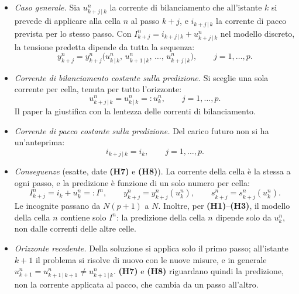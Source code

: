 \documentclass[11pt,a4paper]{article}
\newcommand{\ip}[1]{\textbf{(H#1)}}         %
\begin{document}
\begin{itemize}
  \item \emph{Caso generale.} Sia $u^n_{k+j\,|\,k}$ la corrente di
        bilanciamento che all'istante $k$ si prevede di applicare alla cella
        $n$ al passo $k+j$, e $i_{k+j\,|\,k}$ la corrente di pacco prevista
        per lo stesso passo. Con $I^n_{k+j} = i_{k+j\,|\,k} + u^n_{k+j\,|\,k}$
        nel modello discreto, la tensione predetta dipende da tutta la
        sequenza:
        \[
          y^n_{k+j} = y^n_{k+j}\bigl(u^n_{k\,|\,k},\, u^n_{k+1\,|\,k},\, \dots,\,
                      u^n_{k+j\,|\,k}\bigr) , \qquad j = 1, \dots, p .
          \tag*{[L,~(U1)]}
        \]
  \item[\ip{7}] \emph{Corrente di bilanciamento costante sulla predizione.} Si
        sceglie una sola corrente per cella, tenuta per tutto l'orizzonte:
        \[
          u^n_{k+j\,|\,k} = u^n_{k\,|\,k} =: u^n_k , \qquad j = 1, \dots, p .
          \tag*{[L,~(U2)]; eq.~6b}
        \]
        Il paper la giustifica con la lentezza delle correnti di
        bilanciamento.
  \item[\ip{8}] \emph{Corrente di pacco costante sulla predizione.} Del carico
        futuro non si ha un'anteprima:
        \[
          i_{k+j\,|\,k} = i_k , \qquad j = 1, \dots, p .
          \tag*{[L,~(U2)]}
        \]
  \item \emph{Conseguenze} (esatte, date \ip{7} e \ip{8}). La corrente della
        cella è la stessa a ogni passo, e la predizione è funzione di un solo
        numero per cella:
        \[
          I^n_{k+j} = i_k + u^n_k =: I^n , \qquad
          y^n_{k+j} = y^n_{k+j}(u^n_k) , \qquad
          s^n_{k+j} = s^n_{k+j}(u^n_k) .
          \tag*{[L,~(1), (U3)]}
        \]
        Le incognite passano da $N(p+1)$ a $N$. Inoltre, per \ip{1}--\ip{3},
        il modello della cella $n$ contiene solo $I^n$: la predizione della
        cella $n$ dipende solo da $u^n_k$, non dalle correnti delle altre
        celle.
  \item \emph{Orizzonte recedente.} Della soluzione si applica solo il primo
        passo; all'istante $k+1$ il problema si risolve di nuovo con le nuove
        misure, e in generale
        $u^n_{k+1} = u^n_{k+1\,|\,k+1} \ne u^n_{k+1\,|\,k}$. \ip{7} e \ip{8}
        riguardano quindi la predizione, non la corrente applicata al pacco,
        che cambia da un passo all'altro.
\end{itemize}

\end{document}

